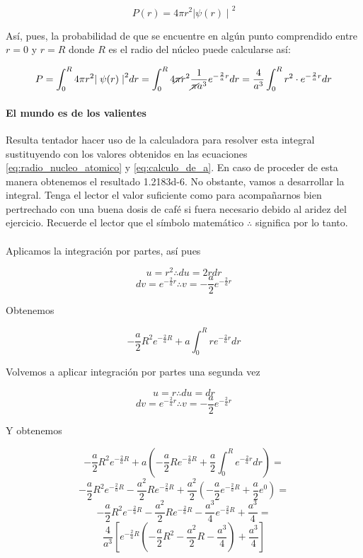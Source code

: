 \documentclass[12pt, a4paper]{article}
\begin{document}
    $$P(r) = 4\pi r^2 {\mid \psi(r) \mid}^2$$

    Así, pues, la probabilidad de que se encuentre en algún punto comprendido entre $r=0$ y $r=R$
    donde $R$ es el radio del núcleo puede calcularse así:

    $$P = \int_{0}^{R} 4\pi r^2 {\mid \psi(r) \mid}^2 dr = \int_{0}^{R} 4\cancel{\pi} r^2 \frac{1}{\cancel{\pi} a^3} e^{-\frac{2}{a}r} dr =
        \frac{4}{a^3} \int_{0}^{R} r^2\cdot e^{-\frac{2}{a}r} dr$$

    \paragraph{El mundo es de los valientes} Resulta tentador hacer uso de la calculadora para resolver esta integral sustituyendo
    con los valores obtenidos en las ecuaciones \ref{eq:radio_nucleo_atomico} y \ref{eq:calculo_de_a}. En caso de proceder
    de esta manera obtenemos el resultado \num{1.2183d-6}. No obstante, vamos a desarrollar la integral. Tenga el lector
    el valor suficiente como para acompañarnos bien pertrechado con una buena dosis de café si fuera necesario debido
    al aridez del ejercicio. Recuerde el lector que el símbolo matemático $\therefore$ significa por lo tanto.

    \paragraph{} Aplicamos la integración por partes, así pues

    $$u=r^2 \therefore du=2r dr$$
    $$dv = e^{-\frac{2}{a}r} \therefore v=-\frac{a}{2}e^{-\frac{2}{a}r}$$

    Obtenemos

    $$-\frac{a}{2}R^2 e^{-\frac{2}{a}R} + a \int_{0}^{R} r e^{-{\frac{2}{a}r}} dr $$

    Volvemos a aplicar integración por partes una segunda vez

    $$u=r \therefore du=dr$$
    $$dv = e^{-\frac{2}{a}r} \therefore v=-\frac{a}{2}e^{-\frac{2}{a}r}$$

    Y obtenemos

    $$-\frac{a}{2}R^2e^{-\frac{2}{a}R}+a\left(-\frac{a}{2}Re^{-\frac{2}{a}R}+\frac{a}{2}\int_{0}^{R}e^{-\frac{2}{a}r} dr\right) =$$
    $$-\frac{a}{2}R^2e^{-\frac{2}{a}R}-\frac{a^2}{2}Re^{-\frac{2}{a}R}+\frac{a^2}{2}\left(-\frac{a}{2}e^{-\frac{2}{a}R}+\frac{a}{2}e^0 \right)=$$
    $$-\frac{a}{2}R^2e^{-\frac{2}{a}R} - \frac{a^2}{2}Re^{-\frac{2}{a}R}-\frac{a^3}{4}e^{-\frac{2}{a}R}+\frac{a^3}{4} =$$
    $$\frac{4}{a^3}\left[e^{-\frac{2}{a}R}\left(-\frac{a}{2}R^2-\frac{a^2}{2}R-\frac{a^3}{4}\right)+\frac{a^3}{4}\right]$$
\end{document}
